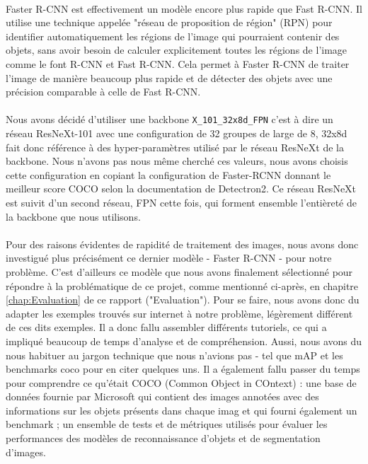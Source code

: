 \paragraph{} Faster R-CNN est effectivement un modèle encore plus rapide que Fast R-CNN. Il utilise une technique appelée "réseau de proposition de région" (RPN) pour identifier automatiquement les régions de l'image qui pourraient contenir des objets, sans avoir besoin de calculer explicitement toutes les régions de l'image comme le font R-CNN et Fast R-CNN. Cela permet à Faster R-CNN de traiter l'image de manière beaucoup plus rapide et de détecter des objets avec une précision comparable à celle de Fast R-CNN.

\paragraph{} Nous avons décidé d'utiliser une backbone \verb|X_101_32x8d_FPN| c'est à dire un réseau ResNeXt-101 avec une configuration de 32 groupes de large de 8, 32x8d fait donc référence à des hyper-paramètres utilisé par le réseau ResNeXt de la backbone. Nous n'avons pas nous même cherché ces valeurs, nous avons choisis cette configuration en copiant la configuration de Faster-RCNN donnant le meilleur score COCO selon la documentation de Detectron2. Ce réseau ResNeXt est suivit d'un second réseau, FPN cette fois, qui forment ensemble l'entièreté de la backbone que nous utilisons.

\paragraph{} Pour des raisons évidentes de rapidité de traitement des images, nous avons donc investigué plus précisément ce dernier modèle - Faster R-CNN - pour notre problème. C'est d'ailleurs ce modèle que nous avons finalement sélectionné pour répondre à la problématique de ce projet, comme mentionné ci-après, en chapitre \autoref{chap:Evaluation} de ce rapport ("Evaluation").\newline
Pour se faire, nous avons donc du adapter les exemples trouvés sur internet à notre problème, légèrement différent de ces dits exemples. Il a donc fallu assembler différents tutoriels, ce qui a impliqué beaucoup de temps d'analyse et de compréhension. Aussi, nous avons du nous habituer au jargon technique que nous n'avions pas - tel que mAP et les benchmarks coco pour en citer quelques uns. Il a également fallu passer du temps pour comprendre ce qu'était COCO (Common Object in COntext) : une base de données fournie par Microsoft qui contient des images annotées avec des informations sur les objets présents dans chaque imag et qui fourni également un benchmark ; un ensemble de tests et de métriques utilisés pour évaluer les performances des modèles de reconnaissance d'objets et de segmentation d'images.

